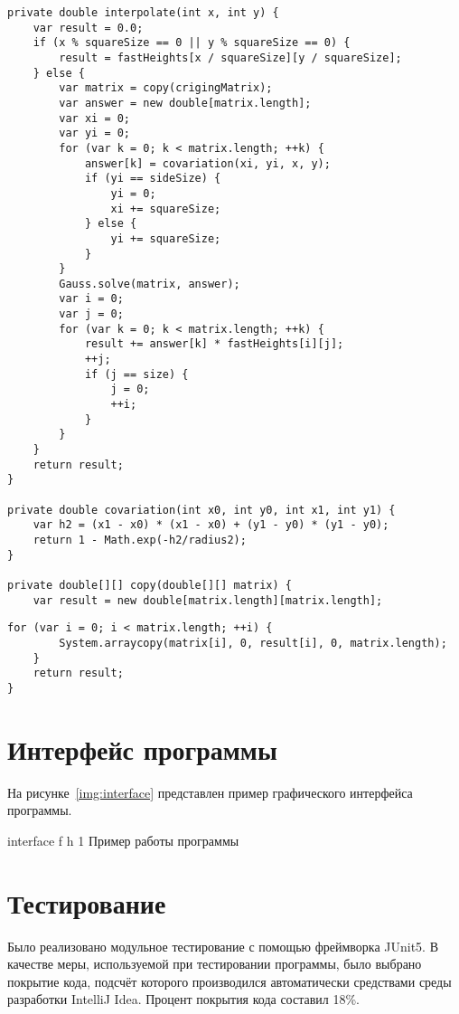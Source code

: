 \begin{lstlisting}[label=lst:gen3,caption=Реализация алгоритма генерации ландшафта (часть~3)]
private double interpolate(int x, int y) {
	var result = 0.0;
	if (x % squareSize == 0 || y % squareSize == 0) {
		result = fastHeights[x / squareSize][y / squareSize];
	} else {
		var matrix = copy(crigingMatrix);
		var answer = new double[matrix.length];
		var xi = 0;
		var yi = 0;
		for (var k = 0; k < matrix.length; ++k) {
			answer[k] = covariation(xi, yi, x, y);
			if (yi == sideSize) {
				yi = 0;
				xi += squareSize;
			} else {
				yi += squareSize;
			}
		}
		Gauss.solve(matrix, answer);
		var i = 0;
		var j = 0;
		for (var k = 0; k < matrix.length; ++k) {
			result += answer[k] * fastHeights[i][j];
			++j;
			if (j == size) {
				j = 0;
				++i;
			}
		}
	}
	return result;
}

private double covariation(int x0, int y0, int x1, int y1) {
	var h2 = (x1 - x0) * (x1 - x0) + (y1 - y0) * (y1 - y0);
	return 1 - Math.exp(-h2/radius2);
}

private double[][] copy(double[][] matrix) {
	var result = new double[matrix.length][matrix.length];
\end{lstlisting}

\begin{lstlisting}[label=lst:gen4,caption=Реализация алгоритма генерации ландшафта (часть~4)]
		for (var i = 0; i < matrix.length; ++i) {
		System.arraycopy(matrix[i], 0, result[i], 0, matrix.length);
	}
	return result;
}
\end{lstlisting}

\section{Интерфейс программы}

На рисунке~\ref{img:interface} представлен пример графического интерфейса программы.

\FloatBarrier
{}
{interface} %
{f} %
{h} %
{1\textwidth} %
{Пример работы программы} %
\FloatBarrier

\section{Тестирование}

Было реализовано модульное тестирование с помощью фреймворка JUnit5. В качестве меры, используемой при тестировании программы, было выбрано покрытие кода, подсчёт которого производился автоматически средствами среды разработки IntelliJ Idea. Процент покрытия кода составил 18\%.

